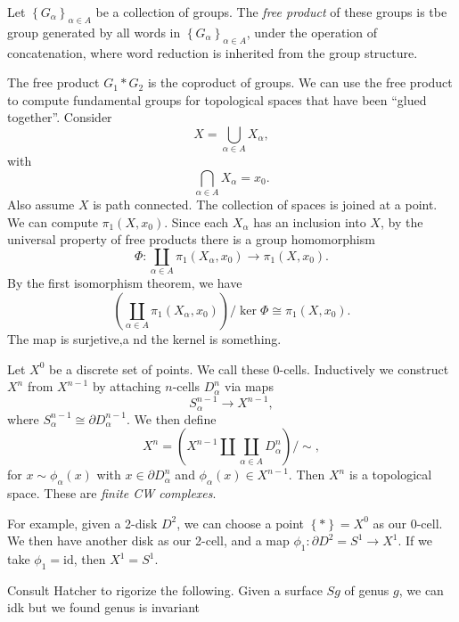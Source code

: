 
\begin{definition}\label{dfn:wj}
	Let $\left\{ G_{\alpha }  \right\}_{\alpha \in A} $ be a collection of groups. The \emph{free product }of these groups is tbe group generated by all words in $\left\{ G_{\alpha }  \right\} _{\alpha \in A} $, under the operation of concatenation, where word reduction is inherited from the group structure.
\end{definition}

The free product $G_1*G_2$ is the coproduct of groups. We can use the free product to compute fundamental groups for topological spaces that have been ``glued together''. Consider
\[
	X=\bigcup_{\alpha \in A} X_\alpha 
,\]
with
\[
	\bigcap_{\alpha \in A} X_\alpha =x_0
.\]
Also assume $X$ is path connected. The collection of spaces is joined at a point. We can compute $\pi _1(X,x_0)$. Since each $X_\alpha $ has an inclusion into $X$, by the universal property of free products there is a group homomorphism
\[
	\Phi : \coprod_{\alpha \in A} \pi _1(X_\alpha ,x_0)\to \pi _1(X,x_0)
.\]
By the first isomorphism theorem, we have
\[
	\left(\coprod_{\alpha \in A}\pi _1(X_\alpha ,x_0)\right) / \ker \Phi \cong \pi _1(X,x_0)
.\]
The map is surjetive,a nd the kernel is something.

Let $X^0$ be a discrete set of points. We call these 0-cells. Inductively we construct $X^n$ from $X^{n-1} $ by attaching $n$-cells $D_\alpha ^n$ via maps
\[
	S_\alpha ^{n-1} \to X^{n-1} ,
\]
where $S_\alpha ^{n-1} \cong \partial D_\alpha ^{n-1} $.  We then define
\[
	X^n = \left( X^{n-1} \amalg \coprod_{\alpha \in A}D_\alpha ^{n}  \right) /\sim ,
\]
for $x\sim \phi_\alpha (x)$ with $x\in \partial D_\alpha ^{n} $ and $\phi_\alpha (x)\in X^{n-1} $. Then $X^n$ is a topological space. These are \emph{finite CW complexes}.

For example, given a 2-disk $D^2$, we can choose a point $\left\{ * \right\} =X^0$ as our 0-cell. We then have another disk as our 2-cell, and a map $\phi_1 : \partial D^2=S^1\to X^1$. If we take $\phi _1=\mathrm{id} $, then $X^1=S^1$.

Consult Hatcher to rigorize the following. Given a surface $Sg$ of genus $g$, we can idk but we found genus is invariant

